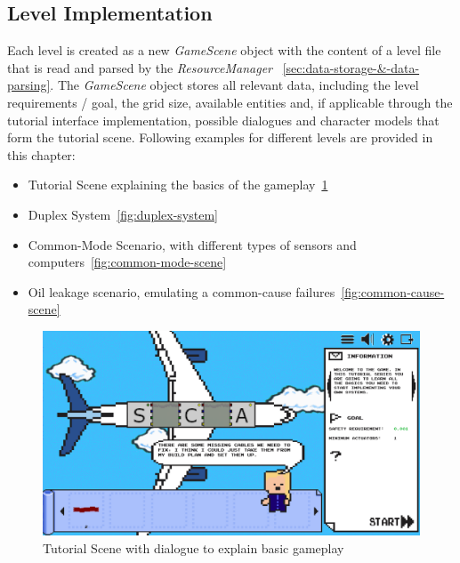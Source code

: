 \subsection{Level Implementation}\label{subsec:level-implementation}
Each level is created as a new \textit{GameScene} object with the content of a level file that is read and parsed by the \textit{ResourceManager}
~\ref{sec:data-storage-&-data-parsing}.
The \textit{GameScene} object stores all relevant data, including the level requirements / goal, the grid size, available entities and,
if applicable through the
tutorial interface implementation, possible dialogues and character models that form the tutorial scene.
Following examples for different levels are provided in this chapter:
\begin{itemize}
    \item Tutorial Scene explaining the basics of the gameplay~\ref{fig:basic-gameplay-tutorial}
    \item Duplex System~\ref{fig:duplex-system}
    \item Common-Mode Scenario, with different types of sensors and computers~\ref{fig:common-mode-scene}
    \item Oil leakage scenario, emulating a common-cause failures~\ref{fig:common-cause-scene}
\end{itemize}
\begin{figure}
    \centering
    \includegraphics[width=\textwidth]{Pictures/res/implementation/scenes/tutorial-game-scene}
    \caption{Tutorial Scene with dialogue to explain basic gameplay}
    \label{fig:basic-gameplay-tutorial}
\end{figure}
